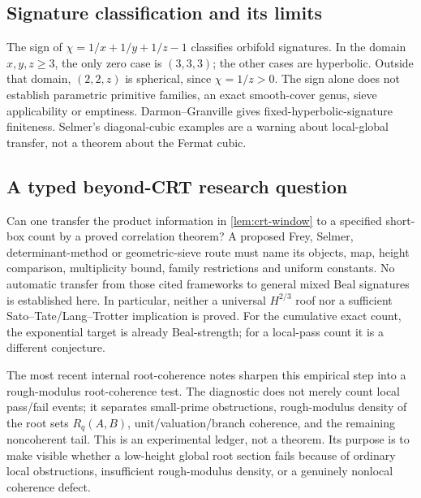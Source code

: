 \documentclass[11pt,a4paper]{article}
\begin{document}
\subsection{Signature classification and its limits}
\label{sec:outlook-phase}

The sign of $\chi=1/x+1/y+1/z-1$ classifies orbifold signatures.
In the domain $x,y,z\ge3$, the only zero case is $(3,3,3)$;
the other cases are hyperbolic. Outside that domain,
$(2,2,z)$ is spherical, since $\chi=1/z>0$.
The sign alone does not establish parametric primitive families,
an exact smooth-cover genus, sieve applicability or emptiness.
Darmon--Granville gives fixed-hyperbolic-signature finiteness.
Selmer's diagonal-cubic examples \cite{Selmer1951} are a warning
about local-global transfer, not a theorem about the Fermat cubic.

\subsection{A typed beyond-CRT research question}
\label{sec:outlook-rqprime}

Can one transfer the product information in \cref{lem:crt-window}
to a specified short-box count by a proved correlation theorem?
A proposed Frey, Selmer, determinant-method or geometric-sieve route
\cite{BS2015,Bhargava2014,HeathBrown2002,KoymansSmith2024}
must name its objects, map, height comparison, multiplicity bound,
family restrictions and uniform constants. No automatic transfer
from those cited frameworks to general mixed Beal signatures is
established here. In particular, neither a universal $H^{2/3}$ roof
nor a sufficient Sato--Tate/Lang--Trotter implication is proved.
For the cumulative exact count, the exponential target is already
Beal-strength; for a local-pass count it is a different conjecture.

The most recent internal root-coherence notes sharpen this empirical
step into a rough-modulus root-coherence test. The diagnostic does not
merely count local pass/fail events; it separates small-prime
obstructions, rough-modulus density of the root sets $R_q(A,B)$,
unit/valuation/branch coherence, and the remaining noncoherent tail.
This is an experimental ledger, not a theorem. Its purpose is to make
visible whether a low-height global root section fails because of
ordinary local obstructions, insufficient rough-modulus density, or a
genuinely nonlocal coherence defect.
\end{document}
